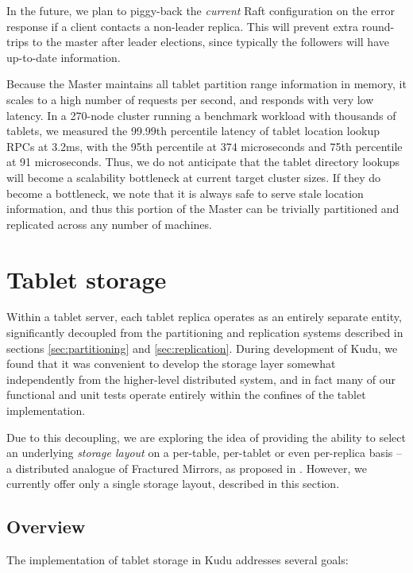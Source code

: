 \documentclass{vldb}
\begin{document}
In the future, we plan to piggy-back the {\em current} Raft configuration on the error response
if a client contacts a non-leader replica. This will prevent extra round-trips to the
master after leader elections, since typically the followers will have up-to-date information.

Because the Master maintains all tablet partition range information in memory, it scales
to a high number of requests per second, and responds with very low latency. In a 270-node
cluster running a benchmark workload with thousands of tablets, we measured the 99.99th percentile
latency of tablet location lookup RPCs at 3.2ms, with the 95th percentile at 374 microseconds
and 75th percentile at 91 microseconds. Thus, we do not anticipate that the tablet directory
lookups will become a scalability bottleneck at current target cluster sizes. If they do become a
bottleneck, we note that it is always safe to serve stale location information, and thus this
portion of the Master can be trivially partitioned and replicated across any number of machines.

\section{Tablet storage}
\label{sec:storage}

Within a tablet server, each tablet replica operates as an entirely separate entity,
significantly decoupled from the partitioning and replication systems described in
sections \ref{sec:partitioning} and \ref{sec:replication}. During development of
Kudu, we found that it was convenient to develop the storage layer somewhat independently
from the higher-level distributed system, and in fact many of our functional and unit
tests operate entirely within the confines of the tablet implementation.

Due to this decoupling, we are exploring the idea of providing the ability to select
an underlying {\em storage layout} on a per-table, per-tablet or even per-replica basis -- a distributed analogue
of Fractured Mirrors, as proposed in \cite{fractured_mirrors}. However, we currently
offer only a single storage layout, described in this section.

\subsection{Overview}

The implementation of tablet storage in Kudu addresses several goals:
\end{document}
